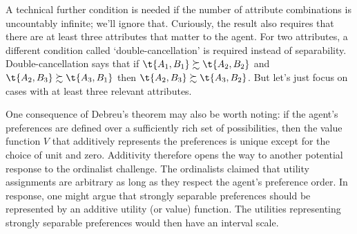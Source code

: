 A technical further condition is needed if the number of attribute
combinations is uncountably infinite; we'll ignore that. Curiously,
the result also requires that there are at least three attributes that
matter to the agent. For two attributes, a different condition called
`double-cancellation' is required instead of
separability. Double-cancellation says that if $\t{A_1,B_1} \succsim
\t{A_2,B_2}$ and $\t{A_2,B_3} \succsim \t{A_3,B_1}$ then $\t{A_2,B_3}
\succsim \t{A_3,B_2}$. But let's just focus on cases with at least
three relevant attributes.

One consequence of Debreu's theorem may also be worth noting: if the
agent's preferences are defined over a sufficiently rich set of
possibilities, then the value function $V$ that additively represents
the preferences is unique except for the choice of unit and
zero. Additivity therefore opens the way to another potential response
to the ordinalist challenge. The ordinalists claimed that utility
assignments are arbitrary as long as they respect the agent's
preference order. In response, one might argue that strongly separable
preferences should be represented by an additive utility (or value)
function. The utilities representing strongly separable preferences
would then have an interval scale.

